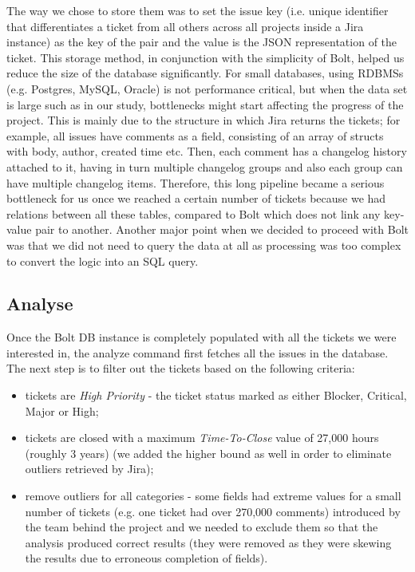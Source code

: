 \documentclass{mpaper}
\begin{document}
The way we chose to store them was to set the issue key (i.e. unique identifier that differentiates a ticket from all others across all 
projects inside a Jira instance) as the key of the pair and the value is the JSON representation of the ticket. This storage method, in conjunction
with the simplicity of Bolt, helped us reduce the size of the database significantly. For small databases, 
using RDBMSs (e.g. Postgres, MySQL, Oracle) is not performance critical, but when the data set is large such as in our study, bottlenecks might start affecting 
the progress of the project. This is mainly due to the structure in which Jira returns the tickets; for example, all issues have comments as 
a field, consisting of an array of structs with body, author, created time etc. Then, each comment has a changelog history attached to it, 
having in turn multiple changelog groups and also each group can have multiple changelog items. Therefore, this long pipeline became a serious 
bottleneck for us once we reached a certain number of tickets because we had relations between all these tables, compared to Bolt which does not 
link any key-value pair to another. Another major point when we decided to proceed with Bolt was that we did not need to query the data at all 
as processing was too complex to convert the logic into an SQL query.

\subsection{Analyse}

Once the Bolt DB instance is completely populated with all the tickets we were interested in, the analyze command first 
fetches all the issues in the database. The next step is to filter out the tickets based on the following criteria:
\begin{itemize}
  \item tickets are \emph{High Priority} - the ticket status marked as either Blocker, Critical, Major or High;
  \item tickets are closed with a maximum \emph{Time-To-Close} value of 27,000 hours (roughly 3 years) (we added the 
  higher bound as well in order to eliminate outliers retrieved by Jira);
  \item remove outliers for all categories - some fields had extreme values for a small number of tickets (e.g. one ticket
  had over 270,000 comments) introduced by the team behind the project and we needed to exclude them so that the analysis 
  produced correct results (they were removed as they were skewing the results due to erroneous completion of fields).
\end{itemize}
\end{document}
